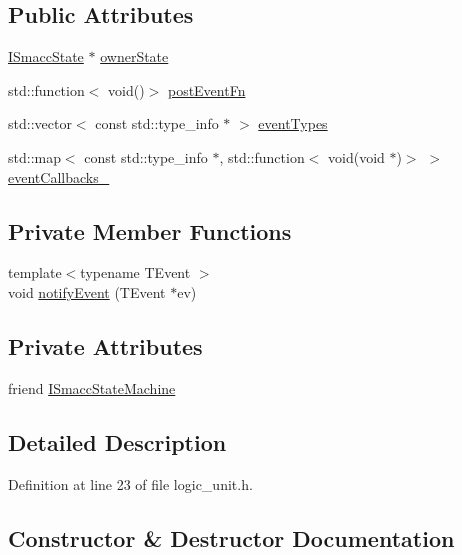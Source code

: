 \subsection*{Public Attributes}
\begin{DoxyCompactItemize}
\item 
\hyperlink{classsmacc_1_1ISmaccState}{I\+Smacc\+State} $\ast$ \hyperlink{classsmacc_1_1LogicUnit_a8863d227f46868876632b07b500f27d6}{owner\+State}
\item 
std\+::function$<$ void()$>$ \hyperlink{classsmacc_1_1LogicUnit_ac75aaeeea0e8d3667763a332ecfd65f7}{post\+Event\+Fn}
\item 
std\+::vector$<$ const std\+::type\+\_\+info $\ast$ $>$ \hyperlink{classsmacc_1_1LogicUnit_a6f02a49da9b408b54a2755c18c5616a8}{event\+Types}
\item 
std\+::map$<$ const std\+::type\+\_\+info $\ast$, std\+::function$<$ void(void $\ast$)$>$ $>$ \hyperlink{classsmacc_1_1LogicUnit_a29196899a02ed436e9ba68784b4d5cf4}{event\+Callbacks\+\_\+}
\end{DoxyCompactItemize}
\subsection*{Private Member Functions}
\begin{DoxyCompactItemize}
\item 
{\footnotesize template$<$typename T\+Event $>$ }\\void \hyperlink{classsmacc_1_1LogicUnit_a1c2bee307f2586bc34c0b75fbc4f6fcf}{notify\+Event} (T\+Event $\ast$ev)
\end{DoxyCompactItemize}
\subsection*{Private Attributes}
\begin{DoxyCompactItemize}
\item 
friend \hyperlink{classsmacc_1_1LogicUnit_a14bbdd3562913437e32ccd3ab0d8a0c7}{I\+Smacc\+State\+Machine}
\end{DoxyCompactItemize}


\subsection{Detailed Description}


Definition at line 23 of file logic\+\_\+unit.\+h.



\subsection{Constructor \& Destructor Documentation}
